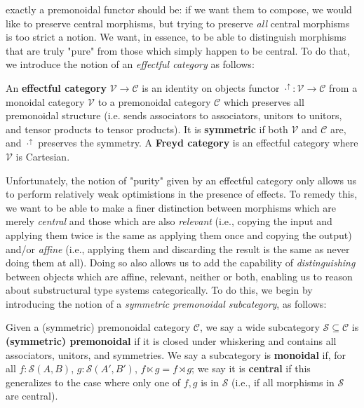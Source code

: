 \documentclass[acmsmall,screen,review]{acmart}
\newcommand{\mc}[1]{\ensuremath{\mathcal{#1}}}
\newcommand{\upg}[2]{{#1}^{\uparrow #2}}
\begin{document}
exactly a premonoidal functor should be: if we want them to compose, we would
like to preserve central morphisms, but trying to preserve \textit{all} central
morphisms is too strict a notion. We want, in essence, to be able to distinguish
morphisms that are truly "pure" from those which simply happen to be central. To
do that, we introduce the notion of an \textit{effectful category} as follows:
\begin{definition} 
  An \textbf{effectful category} \(\mc{V} \to \mc{C}\) is an identity on objects
  functor \(\upg{\cdot}{}: \mc{V} \to \mc{C}\) from a monoidal category
  \(\mc{V}\) to a premonoidal category \(\mc{C}\) which preserves all
  premonoidal structure (i.e. sends associators to associators, unitors to
  unitors, and tensor products to tensor products). It is \textbf{symmetric} if
  both \(\mc{V}\) and \(\mc{C}\) are, and \(\upg{\cdot}{}\) preserves the
  symmetry. A \textbf{Freyd category} is an effectful category where \(\mc{V}\)
  is Cartesian.
\end{definition}
Unfortunately, the notion of "purity" given by an effectful category only allows
us to perform relatively weak optimistions in the presence of effects. To remedy
this, we want to be able to make a finer distinction between morphisms which are
merely \textit{central} and those which are also \textit{relevant} (i.e.,
copying the input and applying them twice is the same as applying them once and
copying the output) and/or \textit{affine} (i.e., applying them and discarding
the result is the same as never doing them at all). Doing so also allows us to
add the capability of \textit{distinguishing} between objects which are affine,
relevant, neither or both, enabling us to reason about substructural type
systems categorically. To do this, we begin by introducing the notion of a \textit{symmetric
premonoidal subcategory}, as follows:
\begin{definition}
  Given a (symmetric) premonoidal category \(\mc{C}\), we say a wide subcategory
  \(\mc{S} \subseteq \mc{C}\) is \textbf{(symmetric) premonoidal} if it is
  closed under whiskering and contains all associators, unitors, and symmetries.
  We say a subcategory is \textbf{monoidal} if, for all \(f: \mc{S}(A, B)\),
  \(g: \mc{S}(A', B')\), \(f \ltimes g = f \rtimes g\); we say it is
  \textbf{central} if this generalizes to the case where only one of \(f, g\) is
  in \(\mc{S}\) (i.e., if all morphisms in \(\mc{S}\) are central).
\end{definition} 
\end{document}
